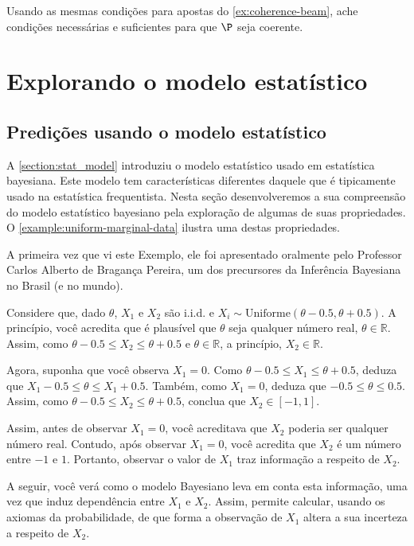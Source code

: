 \begin{exercise}[Desafio]
 Usando as mesmas condições 
 para apostas do \cref{ex:coherence-beam},
 ache condições necessárias e suficientes para que 
 $\P$ seja coerente.
\end{exercise}


\section{Explorando o modelo estatístico}
\subsection{Predições usando o modelo estatístico}

A \cref{section:stat_model} introduziu 
o modelo estatístico usado em estatística bayesiana.
Este modelo tem características diferentes daquele que 
é tipicamente usado na estatística frequentista.
Nesta seção desenvolveremos a sua compreensão do
modelo estatístico bayesiano pela 
exploração de algumas de suas propriedades.
O \cref{example:uniform-marginal-data} ilustra uma
destas propriedades.

\begin{example}
 \label{example:uniform-marginal-data}
 A primeira vez que vi este Exemplo, ele foi 
 apresentado oralmente pelo 
 Professor Carlos Alberto de Bragança Pereira, um 
 dos precursores da Inferência Bayesiana no Brasil 
 (e no mundo).

 Considere que, dado $\theta$, 
 $X_{1}$ e $X_{2}$ são i.i.d. e
 $X_{i} \sim \text{Uniforme}(\theta-0.5,\theta+0.5)$.
 A princípio, você acredita que é plausível que 
 $\theta$ seja qualquer número real, 
 $\theta \in \mathbb{R}$.
 Assim, como $\theta-0.5 \leq X_{2} \leq \theta+0.5$ e 
 $\theta \in \mathbb{R}$,
 a princípio, $X_{2} \in \mathbb{R}$.
 
 Agora, suponha que você observa $X_{1}=0$. 
 Como $\theta-0.5 \leq X_{1} \leq \theta+0.5$,
 deduza que 
 $X_{1}-0.5 \leq \theta \leq X_{1}+0.5$.
 Também, como $X_{1}=0$, deduza que 
 $-0.5 \leq \theta \leq 0.5$.
 Assim, como $\theta-0.5 \leq X_{2} \leq \theta + 0.5$,
 conclua que $X_{2} \in [-1,1]$.

 Assim, antes de observar $X_{1}=0$, você 
 acreditava que $X_{2}$ poderia ser 
 qualquer número real. 
 Contudo, após observar $X_{1}=0$, 
 você acredita que $X_{2}$ é um 
 número entre $-1$ e $1$.
 Portanto, observar o valor de $X_{1}$ traz 
 informação a respeito de $X_{2}$.
 
 A seguir, você verá como o modelo Bayesiano
 leva em conta esta informação,
 uma vez que induz dependência
 entre $X_{1}$ e $X_{2}$.
 Assim, permite calcular,
 usando os axiomas da probabilidade,
 de que forma a observação de $X_{1}$ altera a 
 sua incerteza a respeito de $X_{2}$.
\end{example}

